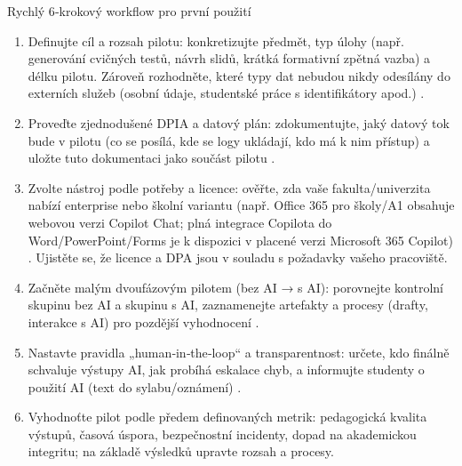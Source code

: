 \documentclass{report}%
\begin{document}
Rychlý 6‑krokový workflow pro první použití
\begin{enumerate}
  \item Definujte cíl a rozsah pilotu: konkretizujte předmět, typ úlohy (např. generování cvičných testů, návrh slidů, krátká formativní zpětná vazba) a délku pilotu. Zároveň rozhodněte, které typy dat nebudou nikdy odesílány do externích služeb (osobní údaje, studentské práce s identifikátory apod.) \cite{kb_malinka_chatgpt_ve_vyuce_dva_roky_pote_2024_pdf_90bc3aaf_page_12_1}.
  \item Proveďte zjednodušené DPIA a datový plán: zdokumentujte, jaký datový tok bude v pilotu (co se posílá, kde se logy ukládají, kdo má k nim přístup) a uložte tuto dokumentaci jako součást pilotu \cite{kb_malinka_chatgpt_ve_vyuce_dva_roky_pote_2024_pdf_90bc3aaf_page_12_1}.
  \item Zvolte nástroj podle potřeby a licence: ověřte, zda vaše fakulta/univerzita nabízí enterprise nebo školní variantu (např. Office 365 pro školy/A1 obsahuje webovou verzi Copilot Chat; plná integrace Copilota do Word/PowerPoint/Forms je k dispozici v placené verzi Microsoft 365 Copilot) \cite{kb_ai_101_tipu_pdf_04e4a115_page_3_1}. Ujistěte se, že licence a DPA jsou v souladu s požadavky vašeho pracoviště.
  \item Začněte malým dvoufázovým pilotem (bez AI → s AI): porovnejte kontrolní skupinu bez AI a skupinu s AI, zaznamenejte artefakty a procesy (drafty, interakce s AI) pro pozdější vyhodnocení \cite{kb_malinka_chatgpt_ve_vyuce_dva_roky_pote_2024_pdf_90bc3aaf_page_12_1}.
  \item Nastavte pravidla „human‑in‑the‑loop“ a transparentnost: určete, kdo finálně schvaluje výstupy AI, jak probíhá eskalace chyb, a informujte studenty o použití AI (text do sylabu/oznámení) \cite{kb_malinka_chatgpt_ve_vyuce_dva_roky_pote_2024_pdf_90bc3aaf_page_12_1}.
  \item Vyhodnoťte pilot podle předem definovaných metrik: pedagogická kvalita výstupů, časová úspora, bezpečnostní incidenty, dopad na akademickou integritu; na základě výsledků upravte rozsah a procesy.
\end{enumerate}
\end{document}
